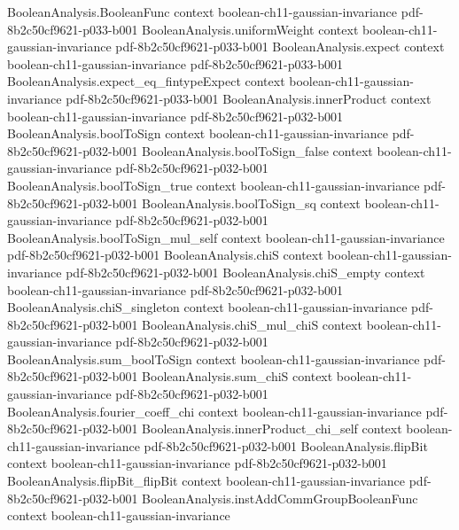 \begin{theorem}
\proofstep
  {BooleanAnalysis.BooleanFunc}
  {context}
  {boolean-ch11-gaussian-invariance}
  {pdf-8b2c50cf9621-p033-b001}
\proofstep
  {BooleanAnalysis.uniformWeight}
  {context}
  {boolean-ch11-gaussian-invariance}
  {pdf-8b2c50cf9621-p033-b001}
\proofstep
  {BooleanAnalysis.expect}
  {context}
  {boolean-ch11-gaussian-invariance}
  {pdf-8b2c50cf9621-p033-b001}
\proofstep
  {BooleanAnalysis.expect_eq_fintypeExpect}
  {context}
  {boolean-ch11-gaussian-invariance}
  {pdf-8b2c50cf9621-p033-b001}
\proofstep
  {BooleanAnalysis.innerProduct}
  {context}
  {boolean-ch11-gaussian-invariance}
  {pdf-8b2c50cf9621-p032-b001}
\proofstep
  {BooleanAnalysis.boolToSign}
  {context}
  {boolean-ch11-gaussian-invariance}
  {pdf-8b2c50cf9621-p032-b001}
\proofstep
  {BooleanAnalysis.boolToSign_false}
  {context}
  {boolean-ch11-gaussian-invariance}
  {pdf-8b2c50cf9621-p032-b001}
\proofstep
  {BooleanAnalysis.boolToSign_true}
  {context}
  {boolean-ch11-gaussian-invariance}
  {pdf-8b2c50cf9621-p032-b001}
\proofstep
  {BooleanAnalysis.boolToSign_sq}
  {context}
  {boolean-ch11-gaussian-invariance}
  {pdf-8b2c50cf9621-p032-b001}
\proofstep
  {BooleanAnalysis.boolToSign_mul_self}
  {context}
  {boolean-ch11-gaussian-invariance}
  {pdf-8b2c50cf9621-p032-b001}
\proofstep
  {BooleanAnalysis.chiS}
  {context}
  {boolean-ch11-gaussian-invariance}
  {pdf-8b2c50cf9621-p032-b001}
\proofstep
  {BooleanAnalysis.chiS_empty}
  {context}
  {boolean-ch11-gaussian-invariance}
  {pdf-8b2c50cf9621-p032-b001}
\proofstep
  {BooleanAnalysis.chiS_singleton}
  {context}
  {boolean-ch11-gaussian-invariance}
  {pdf-8b2c50cf9621-p032-b001}
\proofstep
  {BooleanAnalysis.chiS_mul_chiS}
  {context}
  {boolean-ch11-gaussian-invariance}
  {pdf-8b2c50cf9621-p032-b001}
\proofstep
  {BooleanAnalysis.sum_boolToSign}
  {context}
  {boolean-ch11-gaussian-invariance}
  {pdf-8b2c50cf9621-p032-b001}
\proofstep
  {BooleanAnalysis.sum_chiS}
  {context}
  {boolean-ch11-gaussian-invariance}
  {pdf-8b2c50cf9621-p032-b001}
\proofstep
  {BooleanAnalysis.fourier_coeff_chi}
  {context}
  {boolean-ch11-gaussian-invariance}
  {pdf-8b2c50cf9621-p032-b001}
\proofstep
  {BooleanAnalysis.innerProduct_chi_self}
  {context}
  {boolean-ch11-gaussian-invariance}
  {pdf-8b2c50cf9621-p032-b001}
\proofstep
  {BooleanAnalysis.flipBit}
  {context}
  {boolean-ch11-gaussian-invariance}
  {pdf-8b2c50cf9621-p032-b001}
\proofstep
  {BooleanAnalysis.flipBit_flipBit}
  {context}
  {boolean-ch11-gaussian-invariance}
  {pdf-8b2c50cf9621-p032-b001}
\proofstep
  {BooleanAnalysis.instAddCommGroupBooleanFunc}
  {context}
  {boolean-ch11-gaussian-invariance}

\end{theorem}
